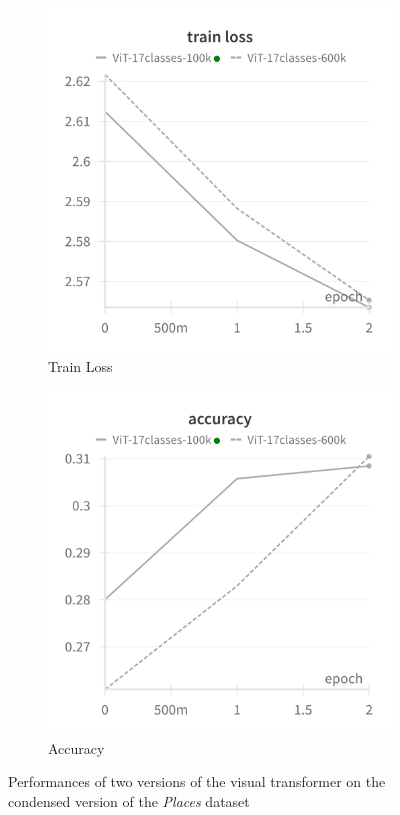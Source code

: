 \documentclass[twocolumn,superscriptaddress,aps]{revtex4-1}
\begin{document}
\begin{figure}[H]
\begin{subfigure}{0.235 \textwidth}
        \includegraphics[width = 0.99 \textwidth]{images/17classes_vit_train.png}
        \caption{Train Loss}
    \end{subfigure}
    \begin{subfigure}{0.35 \textwidth}
        \includegraphics[width = 0.99 \textwidth]{images/17classes_vit_accuracy.png}
        \caption{Accuracy}
    \end{subfigure}
    
    \caption{Performances of two versions of the visual transformer on the condensed version of the \textit{Places} dataset}
    \label{fig:17_vit}
\end{figure}
\end{document}
